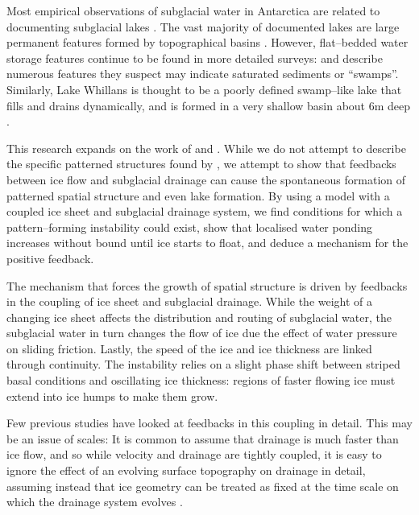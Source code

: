 \documentclass[journal abbreviation, manuscript]{copernicus}
\begin{document}
Most empirical observations of subglacial water in Antarctica are related to documenting subglacial lakes \citep[e.g.][]{carter2007radar,wright2012fourth,siegfried2018thirteen}. The vast majority of documented lakes are large permanent features formed by topographical basins \citep{wright2012fourth}. However, flat--bedded water storage features continue to be found in more detailed surveys: \citet{carter2007radar} and \citet{young2016distribution} describe numerous features they suspect may indicate saturated sediments or ``swamps''. Similarly, Lake Whillans is thought to be a poorly defined swamp--like lake that fills and drains dynamically, and is formed in a very shallow basin about $6 \mathrm{ m}$ deep \citep{horgan2012subglacial}. 

This research expands on the work of \citet{sergienko2011sticky} and \citet{sergienko2014similarity}. While we do not attempt to describe the specific patterned structures found by \citet{sergienko2014similarity}, we attempt to show that feedbacks between ice flow and subglacial drainage can cause the spontaneous formation of patterned spatial structure and even lake formation. By using a model with a coupled ice sheet and subglacial drainage system, we find conditions for which a pattern--forming instability could exist, show that localised water ponding increases without bound until ice starts to float, and  deduce a mechanism for the positive feedback. 

The mechanism that forces the growth of spatial structure is driven by feedbacks in the coupling of ice sheet and subglacial drainage.
While the weight of a changing ice sheet affects the distribution and routing of subglacial water, the subglacial water in turn changes the flow of ice due the effect of water pressure on sliding friction. Lastly, the speed of the ice and ice thickness  are linked through continuity. The instability relies on a slight phase shift between striped basal conditions and oscillating ice thickness: regions of faster flowing ice must extend into ice humps to make them grow. 

Few previous studies have looked at feedbacks in this coupling in detail. This may be an issue of scales:
It is common to assume that drainage is much faster than ice flow, and
so while velocity and drainage are tightly coupled, it is easy to ignore the effect of an evolving surface topography on drainage in detail, assuming instead that ice geometry can be treated as fixed at 
the time scale on which the drainage system evolves \citep[e.g.][]{hindmarsh1998stability,fowler2000instability,schoof2014oscillatory}.
\end{document}
